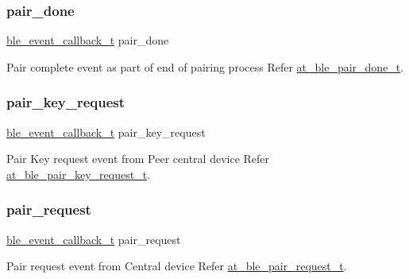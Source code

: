 \subsubsection{\texorpdfstring{pair\_done}{pair\_done}}
{\footnotesize\ttfamily \mbox{\hyperlink{ble__manager_8h_a04ce4bb8cb8282f2762e3924b1773cc9}{ble\+\_\+event\+\_\+callback\+\_\+t}} pair\+\_\+done}



Pair complete event as part of end of pairing process Refer \mbox{\hyperlink{structat__ble__pair__done__t}{at\+\_\+ble\+\_\+pair\+\_\+done\+\_\+t}}. 

\mbox{\label{structble__gap__event__cb_a8b0be84aceb66871327bec983a6d420d}} 
\subsubsection{\texorpdfstring{pair\_key\_request}{pair\_key\_request}}
{\footnotesize\ttfamily \mbox{\hyperlink{ble__manager_8h_a04ce4bb8cb8282f2762e3924b1773cc9}{ble\+\_\+event\+\_\+callback\+\_\+t}} pair\+\_\+key\+\_\+request}



Pair Key request event from Peer central device Refer \mbox{\hyperlink{structat__ble__pair__key__request__t}{at\+\_\+ble\+\_\+pair\+\_\+key\+\_\+request\+\_\+t}}. 

\mbox{\label{structble__gap__event__cb_a2319946e714518f71853159f0c7a7d06}} 
\subsubsection{\texorpdfstring{pair\_request}{pair\_request}}
{\footnotesize\ttfamily \mbox{\hyperlink{ble__manager_8h_a04ce4bb8cb8282f2762e3924b1773cc9}{ble\+\_\+event\+\_\+callback\+\_\+t}} pair\+\_\+request}



Pair request event from Central device Refer \mbox{\hyperlink{structat__ble__pair__request__t}{at\+\_\+ble\+\_\+pair\+\_\+request\+\_\+t}}. 

\mbox{\label{structble__gap__event__cb_a7cae876541e7318f71528229c913ba74}} 
